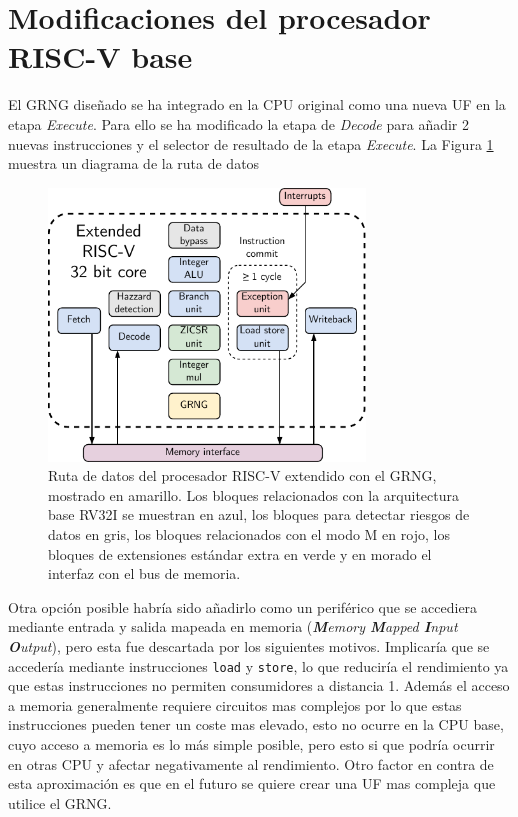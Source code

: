 \section{Modificaciones del procesador RISC-V base}

El GRNG diseñado se ha integrado en la CPU original como una nueva UF en la etapa \textit{Execute}. Para ello se ha modificado la etapa de \textit{Decode} para añadir 2 nuevas instrucciones y el selector de resultado de la etapa \textit{Execute}. La Figura \ref{fig:extended_riscv_core} muestra un diagrama de la ruta de datos 

\begin{figure}[h]
    \centering
    \includegraphics[width=0.75\textwidth]{root/Imagenes/riscv_ext/extended_core.pdf}
    \caption{Ruta de datos del procesador RISC-V extendido con el GRNG, mostrado en amarillo. Los bloques relacionados con la arquitectura base RV32I se muestran en azul, los bloques para detectar riesgos de datos en gris, los bloques relacionados con el modo M en rojo, los bloques de extensiones estándar extra en verde y en morado el interfaz con el bus de memoria.}
    \label{fig:extended_riscv_core}
\end{figure}



Otra opción posible habría sido añadirlo como un periférico que se accediera mediante entrada y salida mapeada en memoria (\textit{\textbf{M}emory \textbf{M}apped \textbf{I}nput \textbf{O}utput}), pero esta fue descartada por los siguientes motivos. Implicaría que se accedería mediante instrucciones \texttt{load} y \texttt{store}, lo que reduciría el rendimiento ya que estas instrucciones no permiten consumidores a distancia 1. Además el acceso a memoria generalmente requiere circuitos mas complejos por lo que estas instrucciones pueden tener un coste mas elevado, esto no ocurre en la CPU base, cuyo acceso a memoria es lo más simple posible, pero esto si que podría ocurrir en otras CPU y afectar negativamente al rendimiento. Otro factor en contra de esta aproximación es que en el futuro se quiere crear una UF mas compleja que utilice el GRNG.

